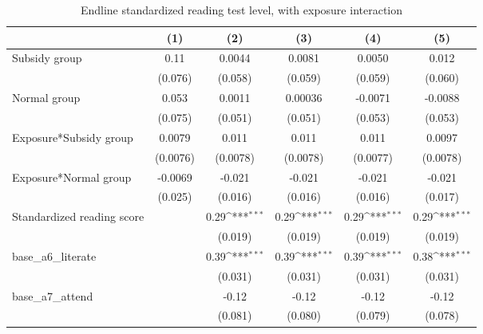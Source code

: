 \begin{table}[htbp]\centering
\def\sym#1{\ifmmode^{#1}\else\(^{#1}\)\fi}
\caption{Endline standardized reading test level, with exposure interaction}
\begin{tabular*}{1\hsize}{@{\hskip\tabcolsep\extracolsep\fill}l*{5}{c}}
\toprule
                &\multicolumn{1}{c}{(1)}         &\multicolumn{1}{c}{(2)}         &\multicolumn{1}{c}{(3)}         &\multicolumn{1}{c}{(4)}         &\multicolumn{1}{c}{(5)}         \\
\midrule
Subsidy group   &     0.11         &   0.0044         &   0.0081         &   0.0050         &    0.012         \\
                &  (0.076)         &  (0.058)         &  (0.059)         &  (0.059)         &  (0.060)         \\
Normal group    &    0.053         &   0.0011         &  0.00036         &  -0.0071         &  -0.0088         \\
                &  (0.075)         &  (0.051)         &  (0.051)         &  (0.053)         &  (0.053)         \\
Exposure*Subsidy group&   0.0079         &    0.011         &    0.011         &    0.011         &   0.0097         \\
                & (0.0076)         & (0.0078)         & (0.0078)         & (0.0077)         & (0.0078)         \\
Exposure*Normal group&  -0.0069         &   -0.021         &   -0.021         &   -0.021         &   -0.021         \\
                &  (0.025)         &  (0.016)         &  (0.016)         &  (0.016)         &  (0.017)         \\
Standardized reading score&                  &     0.29\sym{***}&     0.29\sym{***}&     0.29\sym{***}&     0.29\sym{***}\\
                &                  &  (0.019)         &  (0.019)         &  (0.019)         &  (0.019)         \\
base\_a6\_literate&                  &     0.39\sym{***}&     0.39\sym{***}&     0.39\sym{***}&     0.38\sym{***}\\
                &                  &  (0.031)         &  (0.031)         &  (0.031)         &  (0.031)         \\
base\_a7\_attend  &                  &    -0.12         &    -0.12         &    -0.12         &    -0.12         \\
                &                  &  (0.081)         &  (0.080)         &  (0.079)         &  (0.078)         \\

\end{tabular*}
\end{table}
